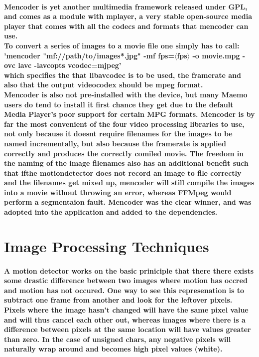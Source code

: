 \paragraph{ {\bf Mencoder} is yet another multimedia framework released under GPL, and comes as a module with mplayer, a very stable open-source media player that comes with all the codecs and formats that mencoder can use.\\
To convert a series of images to a movie file one simply has to call:\\
'mencoder "mf://path/to/images*.jpg" -mf fps=\(\langle\)fps\(\rangle\) -o movie.mpg -ovc lavc -lavcopts vcodec=mjpeg'\\
which specifies the that libavcodec is to be used, the framerate and also that the output videocodex should be mpeg format.
\\Mencoder is also not pre-installed with the device, but many Maemo users do tend to install it first chance they get due to the default Media Player's poor support for certain MPG formats. Mencoder is by far the most convenient of the four video processing libraries to use, not only because it doesnt require filenames for the images to be named incrementally, but also because the framerate is applied correctly and produces the correctly comiled movie. The freedom in the naming of the image filenames also has an additional benefit such that ifthe motiondetector does not record an image to file correctly and the filenames get mixed up, mencoder will still compile the images into a movie without throwing an error, whereas FFMpeg would perform a segmentaion fault. Mencoder was the clear winner, and was adopted into the application and added to the dependencies.}


\section{Image Processing Techniques}
\paragraph{A motion detector works on the basic priniciple that there there exists some drastic difference between two images where motion has occred and motion has not occured. One way to see this represenation is to subtract one frame from another and look for the leftover pixels. Pixels where the image hasn't changed will have the same pixel value and will thus cancel each other out, whereas images where there is a difference between pixels at the same location will have values greater than zero. In the case of unsigned chars, any negative pixels will naturally wrap around and becomes high pixel values (white).}
